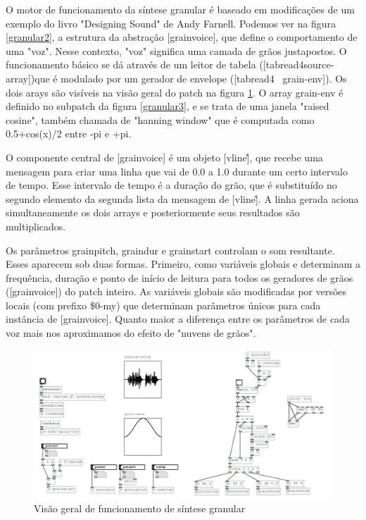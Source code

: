 \documentclass{ppgmus}
\begin{document}
O motor de funcionamento da síntese granular é baseado em modificações de um exemplo
do livro "Designing Sound" de Andy Farnell. Podemos ver na figura \ref{granular2}, a estrutura
da abstração [grainvoice], que define o comportamento de uma "voz". Nesse contexto,
"voz" significa uma camada de grãos justapostos. O funcionamento básico se dá através
de um leitor de tabela ([tabread4\texttildelow source-array])que é modulado por um gerador de envelope ([tabread4~ grain-env]).
Os dois arays são visíveis na visão geral do patch na figura \ref{granular-geral}. O array grain-env
é definido no subpatch da figura \ref{granular3}, e se trata de uma janela "raised cosine", também
chamada de "hanning window" que é computada como 0.5+cos(x)/2 entre -pi e +pi.

O componente central de [grainvoice] é um objeto [vline\~], que recebe uma mensagem para criar uma linha que 
vai de 0.0 a 1.0 durante um certo intervalo de tempo. Esse intervalo de tempo é a duração
do grão, que é substituído no segundo elemento da segunda lista da mensagem de [vline\~].
A linha gerada aciona simultaneamente os dois arrays e posteriormente 
seus resultados são multiplicados.

Os parâmetros grainpitch, graindur e grainstart controlam o som resultante. Esses aparecem sob duas
formas. Primeiro, como variáveis globais e determinam a frequência, duração e ponto de início de leitura para
todos os geradores de grãos ([grainvoice]) do patch inteiro. As variáveis globais são modificadas
por versões locais (com prefixo \$0-my) que determinam parâmetros únicos para cada instância de [grainvoice].
Quanto maior a diferença entre os parâmetros de cada voz mais nos aproximamos do efeito de "nuvens de grãos".

\begin{figure}
\includegraphics[scale=.6]{granular-geral}
\caption{Visão geral de funcionamento de síntese granular}
\label{granular-geral}
\end{figure}
\end{document}
